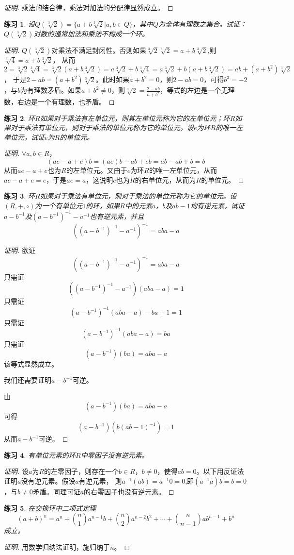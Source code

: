 \documentclass{article}
\newtheorem{Exercise}{练习}
\begin{document}
\begin{CJK*}{UTF8}{gbsn}
\begin{proof}[证明]
  乘法的结合律，乘法对加法的分配律显然成立。
\end{proof}
\begin{Exercise}
  设$Q(\sqrt[3]{2})=\{a+b\sqrt[3]{2}|a,b\in Q\}$，其中$Q$为全体有理数之集合。试证：$Q(\sqrt[3]{2})$对数的通常加法和乘法不构成一个环。
\end{Exercise}
\begin{proof}[证明]
  $Q(\sqrt[3]{2})$对乘法不满足封闭性。否则如果$\sqrt[3]{2}\sqrt[3]{2}=a+b\sqrt[3]{2}$,则$\sqrt[3]{4}=a+b\sqrt[3]{2}$，
  从而$2=\sqrt[3]{2}\sqrt[3]{4}=\sqrt[3]{2}(a+b\sqrt[3]{2})=a\sqrt[3]{2}+b\sqrt[3]{4}=a\sqrt[3]{2}+b(a+b\sqrt[3]{2})=ab+(a+b^2)\sqrt[3]{2}$，
  于是$2-ab=(a+b^2)\sqrt[3]{2}$。此时如果$a+b^2=0$，则$2-ab=0$，可得$b^3=-2$，与$b$为有理数矛盾。如果$a+b^2\neq 0$，则$\sqrt[3]{2}=\frac{2-ab}{a+b^2}$，等式的左边是一个无理数，右边是一个有理数，也矛盾。
\end{proof}
\begin{Exercise}
  环$R$如果对于乘法有左单位元，则其左单位元称为它的左单位元；环$R$如果对于乘法有单位元，则对于乘法的单位元称为它的单位元。设$e$为环$R$的唯一左单位元，试证$e$为$R$的单位元。
\end{Exercise}
\begin{proof}[证明]
  $\forall a,b\in R$，
  \[(ae-a+e)b=(ae)b-ab+eb=ab-ab+b=b\]
  从而$ae-a+e$也为$R$的左单位元。又由于$e$为环$R$的唯一左单位元，从而$ae-a+e=e$，于是$ae=a$，这说明$e$也为$R$的右单位元，从而为$R$的单位元。
\end{proof}
\begin{Exercise}
  环$R$如果对于乘法有单位元，则对于乘法的单位元称为它的单位元。设$(R,+,\circ)$为一个有单位元$1$的环，如果$R$中的元素$a$，$b$及$ab-1$均有逆元素，试证$a-b^{-1}$及$(a-b^{-1})^{-1}-a^{-1}$也有逆元素，并且
\[((a-b^{-1})^{-1}-a^{-1})^{-1}=aba-a\]
\end{Exercise}
\begin{proof}[证明]
  欲证
  \[((a-b^{-1})^{-1}-a^{-1})^{-1}=aba-a\]
  只需证
  \[((a-b^{-1})^{-1}-a^{-1})(aba-a)=1\]
  只需证
  \[(a-b^{-1})^{-1}(aba-a)-ba+1=1\]
  只需证
  \[(a-b^{-1})^{-1}(aba-a)=ba\]
  只需证
  \[(a-b^{-1})(ba)=aba-a\]
  该等式显然成立。

  我们还需要证明$a-b^{-1}$可逆。

  由
  \[(a-b^{-1})(ba)=aba-a\]
  可得
  \[(a-b^{-1})(b(ab-1)^{-1})=1\]
  从而$a-b^{-1}$可逆。

\end{proof}
\begin{Exercise}
  有单位元素的环$R$中零因子没有逆元素。
\end{Exercise}
\begin{proof}[证明]
  设$a$为$R$的左零因子，则存在一个$b\in R$，$b\neq 0$，使得$ab=0$。以下用反证法证明$a$没有逆元素。假设$a$有逆元素，
  则$a^{-1}(ab)=a^{-1}0=0$,即$(a^{-1}a)b=b=0$，与$b\neq 0$矛盾。同理可证$a$的右零因子也没有逆元素。
\end{proof}
\begin{Exercise}
  在交换环中二项式定理
\[(a+b)^n=a^n+\binom{n}{1}a^{n-1}b+\binom{n}{2}a^{n-2}b^2+\cdots+\binom{n}{n-1}ab^{n-1}+b^n\]
  成立。
\end{Exercise}
\begin{proof}[证明]
用数学归纳法证明，施归纳于$n$。


\end{proof}
\end{CJK*}
\end{document}
